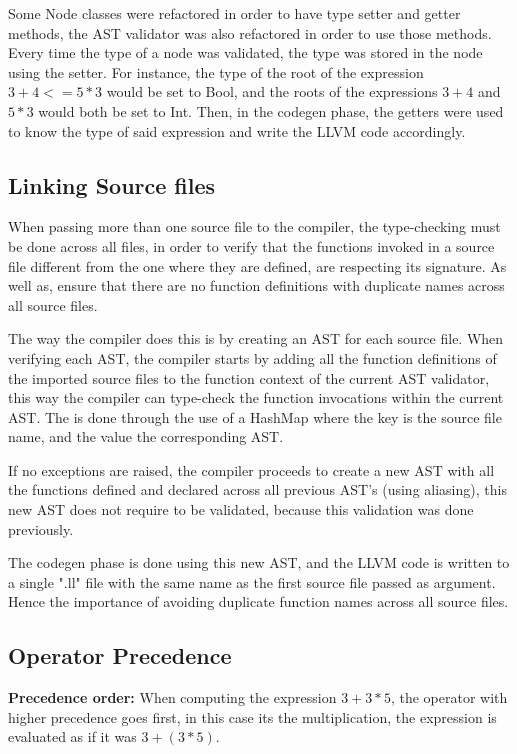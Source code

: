 \documentclass[12pt]{article}
\begin{document}
Some Node classes were refactored in order to have type setter and getter methods, the AST validator was also refactored in order to use those methods. Every time the type of a node was validated, the type was stored in the node using the setter.
For instance, the type of the root of the expression $3+4 <= 5*3$ would be set to Bool, and the roots of the expressions $3+4$ and $5*3$ would both be set to Int. Then, in the codegen phase, the getters were used to know the type of said expression and write the LLVM code accordingly.


\subsection{Linking Source files}
When passing more than one source file to the compiler, the type-checking must be done across all files, in order to verify that the functions invoked in a source file different from the one where they are defined, are respecting its signature. As well as, ensure that there are no function definitions with duplicate names across all source files.

The way the compiler does this is by creating an AST for each source file. When verifying each AST, the compiler starts by adding all the function definitions of the imported source files to the function context of the current AST validator, this way the compiler can type-check the function invocations within the current AST. The is done through the use of a HashMap where the key is the source file name, and the value the corresponding AST.

If no exceptions are raised, the compiler proceeds to create a new AST with all the functions defined and declared across all previous AST's (using aliasing), this new AST does not require to be validated, because this validation was done previously.

The codegen phase is done using this new AST, and the LLVM code is written to a single ".ll" file with the same name as the first source file passed as argument. Hence the importance of avoiding duplicate function names across all source files.

\newpage

\subsection{Operator Precedence}

\textbf{Precedence order:} When computing the expression $3 + 3 * 5$, the operator with higher precedence goes first, in this case its the multiplication, the expression is  evaluated as if it was $3 + (3 * 5)$. 
\end{document}
